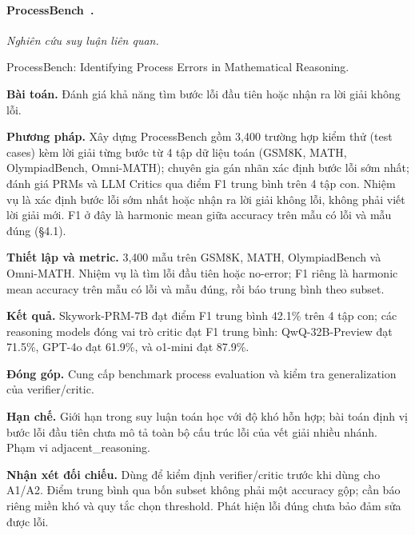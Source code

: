 \begin{samepage}
\paragraph{ProcessBench~\cite{rra4_processbench}.}
\emph{Nghiên cứu suy luận liên quan.}\par
{\raggedright\noindent\small ProcessBench: Identifying Process Errors in Mathematical Reasoning.\par}
\noindent\textbf{Bài toán.} Đánh giá khả năng tìm bước lỗi đầu tiên hoặc nhận ra lời giải không lỗi.\par
\end{samepage}
\noindent\textbf{Phương pháp.} Xây dựng ProcessBench gồm 3,400 trường hợp kiểm thử (test cases) kèm lời giải từng bước từ 4 tập dữ liệu toán (GSM8K, MATH, OlympiadBench, Omni-MATH); chuyên gia gán nhãn xác định bước lỗi sớm nhất; đánh giá PRMs và LLM Critics qua điểm F1 trung bình trên 4 tập con. Nhiệm vụ là xác định bước lỗi sớm nhất hoặc nhận ra lời giải không lỗi, không phải viết lời giải mới. F1 ở đây là harmonic mean giữa accuracy trên mẫu có lỗi và mẫu đúng (§4.1).\par
\noindent\textbf{Thiết lập và metric.} 3,400 mẫu trên GSM8K, MATH, OlympiadBench và Omni-MATH. Nhiệm vụ là tìm lỗi đầu tiên hoặc no-error; F1 riêng là harmonic mean accuracy trên mẫu có lỗi và mẫu đúng, rồi báo trung bình theo subset.\par
\noindent\textbf{Kết quả.} Skywork-PRM-7B đạt điểm F1 trung bình 42.1\% trên 4 tập con; các reasoning models đóng vai trò critic đạt F1 trung bình: QwQ-32B-Preview đạt 71.5\%, GPT-4o đạt 61.9\%, và o1-mini đạt 87.9\%.\par
\noindent\textbf{Đóng góp.} Cung cấp benchmark process evaluation và kiểm tra generalization của verifier/critic.\par
\noindent\textbf{Hạn chế.} Giới hạn trong suy luận toán học với độ khó hỗn hợp; bài toán định vị bước lỗi đầu tiên chưa mô tả toàn bộ cấu trúc lỗi của vết giải nhiều nhánh. Phạm vi adjacent\_reasoning.\par
\begin{samepage}
\noindent\textbf{Nhận xét đối chiếu.} Dùng để kiểm định verifier/critic trước khi dùng cho A1/A2. Điểm trung bình qua bốn subset không phải một accuracy gộp; cần báo riêng miền khó và quy tắc chọn threshold. Phát hiện lỗi đúng chưa bảo đảm sửa được lỗi.\par
{}
\end{samepage}


